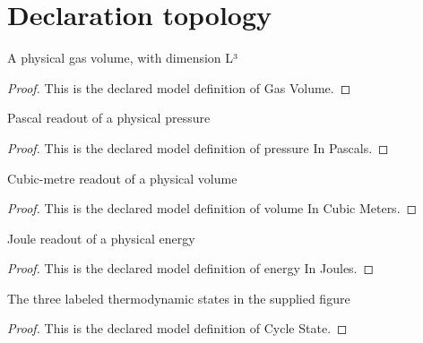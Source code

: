 \section{Declaration topology}
\begin{definition}
  \label{def:physics:phyx-mini-0342:phyxminiproblems-problemphyxmini0342-gasvolume}
  A physical gas volume, with dimension L³
\end{definition}
\begin{proof}
  This is the declared model definition of Gas Volume.
\end{proof}
\begin{definition}
  \label{def:physics:phyx-mini-0342:phyxminiproblems-problemphyxmini0342-pressureinpascals}
  Pascal readout of a physical pressure
\end{definition}
\begin{proof}
  This is the declared model definition of pressure In Pascals.
\end{proof}
\begin{definition}
  \label{def:physics:phyx-mini-0342:phyxminiproblems-problemphyxmini0342-volumeincubicmeters}
  Cubic-metre readout of a physical volume
\end{definition}
\begin{proof}
  This is the declared model definition of volume In Cubic Meters.
\end{proof}
\begin{definition}
  \label{def:physics:phyx-mini-0342:phyxminiproblems-problemphyxmini0342-energyinjoules}
  Joule readout of a physical energy
\end{definition}
\begin{proof}
  This is the declared model definition of energy In Joules.
\end{proof}
\begin{definition}
  \label{def:physics:phyx-mini-0342:phyxminiproblems-problemphyxmini0342-cyclestate}
  The three labeled thermodynamic states in the supplied figure
\end{definition}
\begin{proof}
  This is the declared model definition of Cycle State.
\end{proof}
